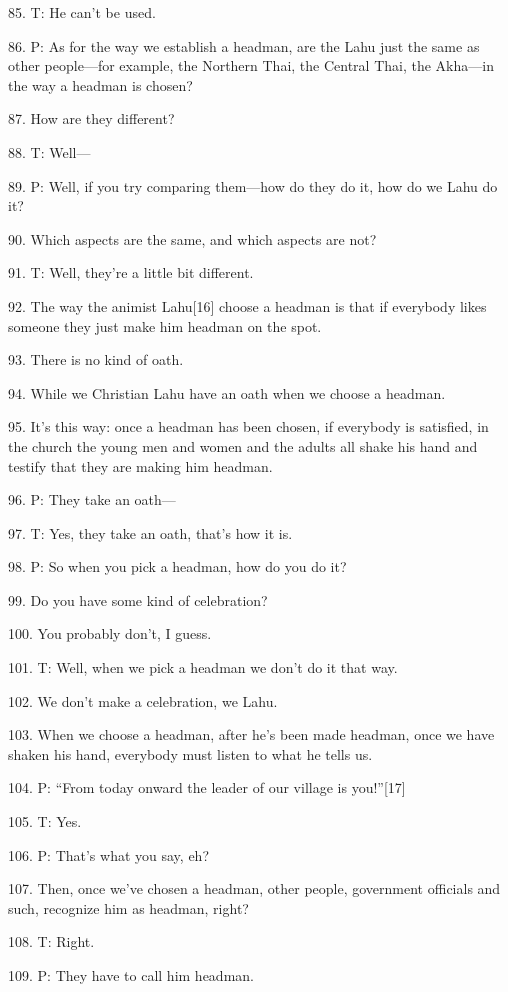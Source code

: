 {85. T: He can't be used.}

{86. P: As for the way we establish a headman, are the Lahu just the same
as other people---for example, the Northern Thai, the Central Thai, the Akha---in
the way a headman is chosen?}

{87. How are they different?}

{88. T: Well---}

{89. P: Well, if you try comparing them---how do they do it, how do we Lahu
do it?}

{90. Which aspects are the same, and which aspects are not?}

{91. T: Well, they're a little bit different.}

{92. The way the animist Lahu[16] choose a headman is that if everybody
likes someone they just make him headman on the spot.}

{93. There is no kind of oath.}

{94. While we Christian Lahu have an oath when we choose a headman.}

{95. It's this way: once a headman has been chosen, if everybody is satisfied,
in the church the young men and women and the adults all shake his hand and testify
that they are making him headman.}

{96. P: They take an oath---}

{97. T: Yes, they take an oath, that's how it is.}

{98. P: So when you pick a headman, how do you do it?}

{99. Do you have some kind of celebration?}

{100. You probably don't, I guess.}

{101. T: Well, when we pick a headman we don't do it that way.}

{102. We don't make a celebration, we Lahu.}

{103. When we choose a headman, after he's been made headman, once we have
shaken his hand, everybody must listen to what he tells us.}

{104. P: ``From today onward the leader of our village is you!''[17]}

{105. T: Yes.}

{106. P: That's what you say, eh?}

{107. Then, once we've chosen a headman, other people, government officials
and such, recognize him as headman, right?}

{108. T: Right.}

{109. P: They have to call him headman.}

